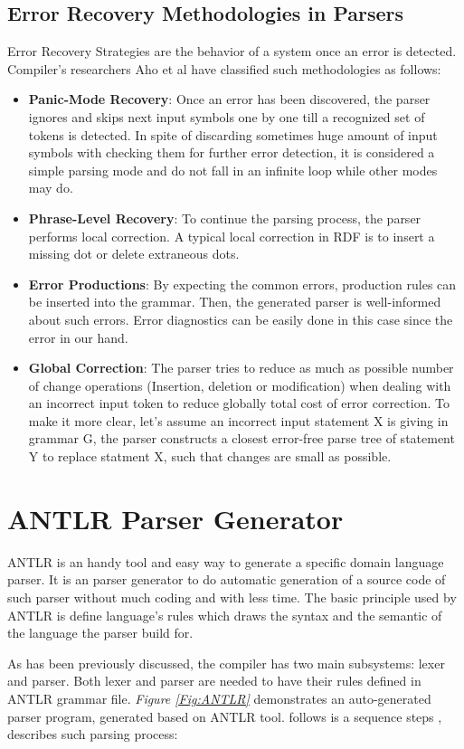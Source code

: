 {{{{{\subsection{Error Recovery Methodologies in Parsers}
Error Recovery Strategies are the behavior of a system once an error is detected. Compiler's researchers Aho et al \cite{Aho2006}  have classified such methodologies as follows:
\begin{itemize}
	\item \textbf{Panic-Mode Recovery}: Once an error has been discovered, the parser ignores and skips next input symbols one by one till a recognized set of tokens is detected. In spite of discarding sometimes huge amount of input symbols with checking them for further error detection, it is considered a simple parsing mode and do not fall in an infinite loop while other modes may do.
	\item \textbf{Phrase-Level Recovery}: To continue the parsing process, the parser performs local correction. A typical local correction in RDF is to insert a missing dot or delete extraneous dots.
	\item \textbf{Error Productions}: By expecting the common errors, production rules can be inserted into the grammar. Then, the generated parser is well-informed about such errors. Error diagnostics can be easily done in this case since the error in our hand.
	\item \textbf{Global Correction}: The parser tries to reduce as much as possible number of change operations (Insertion, deletion or modification) when dealing with an incorrect input token to reduce globally total cost of error correction. To make it more clear, let's assume an incorrect input statement X is giving in grammar G, the parser constructs a closest error-free parse tree of statement Y to replace statment X, such that changes are small as possible. 
\end{itemize}


\section{ANTLR Parser Generator }
ANTLR is an handy tool and easy way to generate a specific domain language parser. It is an parser generator to do automatic generation of a source code of such parser without much coding and with less time. The basic principle used by ANTLR is define language's rules which draws the syntax and the semantic of the language the parser build for. 

\vspace{5mm} %
\par
 As has been previously discussed, the compiler has two main subsystems: lexer and parser. Both lexer and parser are needed to have their rules defined in ANTLR grammar file.  {\it Figure \ref{Fig:ANTLR}} demonstrates an auto-generated parser program, generated based on ANTLR tool. follows is a sequence steps \citealp{ANTLR:Tool:Online}, describes such parsing process:

}}}}}
